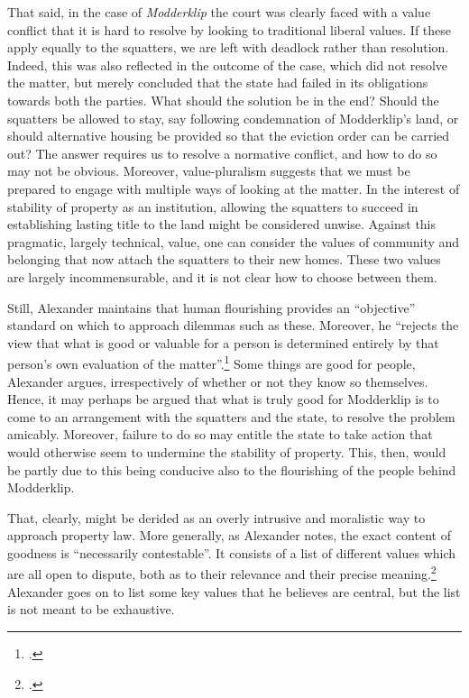 That said, in the case of {\it Modderklip} the court was clearly faced with a value conflict that it is hard to resolve by looking to traditional liberal values. If these apply equally to the squatters, we are left with deadlock rather than resolution. Indeed, this was also reflected in the outcome of the case, which did not resolve the matter, but merely concluded that the state had failed in its obligations towards both the parties. What should the solution be in the end? Should the squatters be allowed to stay, say following condemnation of Modderklip's land, or should alternative housing be provided so that the eviction order can be carried out? The answer requires us to resolve a normative conflict, and how to do so may not be obvious. Moreover, value-pluralism suggests that we must be prepared to engage with multiple ways of looking at the matter. In the interest of stability of property as an institution, allowing the squatters to succeed in establishing lasting title to the land might be considered unwise. Against this pragmatic, largely technical, value, one can consider the values of community and belonging that now attach the squatters to their new homes. These two values are largely incommensurable, and it is not clear how to choose between them.

Still, Alexander maintains that human flourishing provides an ``objective'' standard on which to approach dilemmas such as these. Moreover, he ``rejects the view that what is good or valuable for a person is determined entirely by that person's own evaluation of the matter''.\footcite[1263]{alexander14} Some things are good for people, Alexander argues, irrespectively of whether or not they know so themselves. Hence, it may perhaps be argued that what is truly good for Modderklip is to come to an arrangement with the squatters and the state, to resolve the problem amicably. Moreover, failure to do so may entitle the state to take action that would otherwise seem to undermine the stability of property. This, then, would be partly due to this being conducive also to the flourishing of the people behind Modderklip.

That, clearly, might be derided as an overly intrusive and moralistic way to approach property law. More generally, as Alexander notes, the exact content of goodness is ``necessarily contestable''. It consists of a list of different values which are all open to dispute, both as to their relevance and their precise meaning.\footcite[1263]{alexander14} Alexander goes on to list some key values that he believes are central, but the list is not meant to be exhaustive. 


